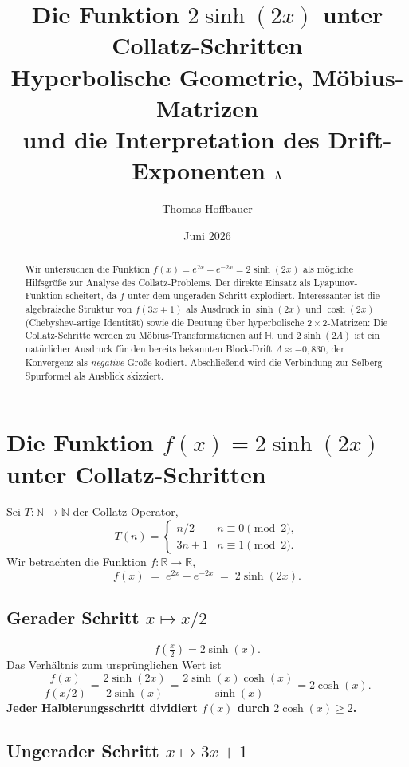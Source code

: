 \documentclass[12pt,a4paper]{article}
\title{\textbf{Die Funktion $2\sinh(2x)$ unter Collatz-Schritten}\\
\large Hyperbolische Geometrie, Möbius-Matrizen\\
und die Interpretation des Drift-Exponenten $\Lamb$}
\author{Thomas Hoffbauer}
\date{Juni 2026}
\newcommand{\sinh}{\operatorname{sinh}}
\renewcommand{\cosh}{\operatorname{cosh}}
\newcommand{\R}{\mathbb{R}}
\newcommand{\N}{\mathbb{N}}
\newcommand{\Lamb}{\Lambda}
\begin{document}
\maketitle
\tableofcontents
\bigskip

\begin{abstract}
Wir untersuchen die Funktion $f(x) = e^{2x} - e^{-2x} = 2\sinh(2x)$
als mögliche Hilfsgröße zur Analyse des Collatz-Problems.
Der direkte Einsatz als Lyapunov-Funktion scheitert, da $f$ unter dem
ungeraden Schritt explodiert.
Interessanter ist die algebraische Struktur von $f(3x+1)$
als Ausdruck in $\sinh(2x)$ und $\cosh(2x)$ (Chebyshev-artige Identität)
sowie die Deutung über hyperbolische $2{\times}2$-Matrizen:
Die Collatz-Schritte werden zu Möbius-Transformationen auf $\mathbb{H}$,
und $2\sinh(2\Lamb)$ ist ein natürlicher Ausdruck für den bereits
bekannten Block-Drift $\Lamb \approx -0{,}830$,
der Konvergenz als \emph{negative} Größe kodiert.
Abschließend wird die Verbindung zur Selberg-Spurformel als Ausblick skizziert.
\end{abstract}

\section{Die Funktion $f(x)=2\sinh(2x)$ unter Collatz-Schritten}

Sei $T\colon \N \to \N$ der Collatz-Operator,
\[
  T(n) = \begin{cases} n/2 & n \equiv 0 \pmod{2},\\
                       3n+1 & n \equiv 1 \pmod{2}.\end{cases}
\]
Wir betrachten die Funktion $f\colon \R \to \R$,
\[
  f(x) \;=\; e^{2x} - e^{-2x} \;=\; 2\sinh(2x).
\]

\subsection{Gerader Schritt $x \mapsto x/2$}

\[
  f\!\left(\tfrac{x}{2}\right) = 2\sinh(x).
\]
Das Verhältnis zum ursprünglichen Wert ist
\[
  \frac{f(x)}{f(x/2)} = \frac{2\sinh(2x)}{2\sinh(x)}
  = \frac{2\sinh(x)\cosh(x)}{\sinh(x)} = 2\cosh(x).
\]
\textbf{Jeder Halbierungsschritt dividiert $f(x)$ durch $2\cosh(x) \ge 2$.}

\subsection{Ungerader Schritt $x \mapsto 3x+1$}
\end{document}

